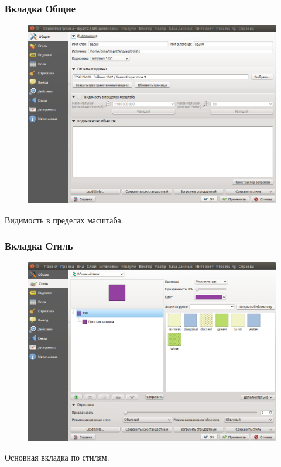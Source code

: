 

\begin{frame}
    \frametitle{Вкладка Общие}
    \begin{figure}[!ht]
           \begin{center}
               \includegraphics[width=0.95\columnwidth]{./practic/img/common.png}
           \end{center}
       \end{figure}
       Видимость в пределах масштаба.
\end{frame}

\begin{frame}
    \frametitle{Вкладка Стиль}
    \begin{figure}[!ht]
           \begin{center}
               \includegraphics[width=0.95\columnwidth]{./practic/img/style.png}
           \end{center}
       \end{figure}
       Основная вкладка по стилям.
\end{frame}

